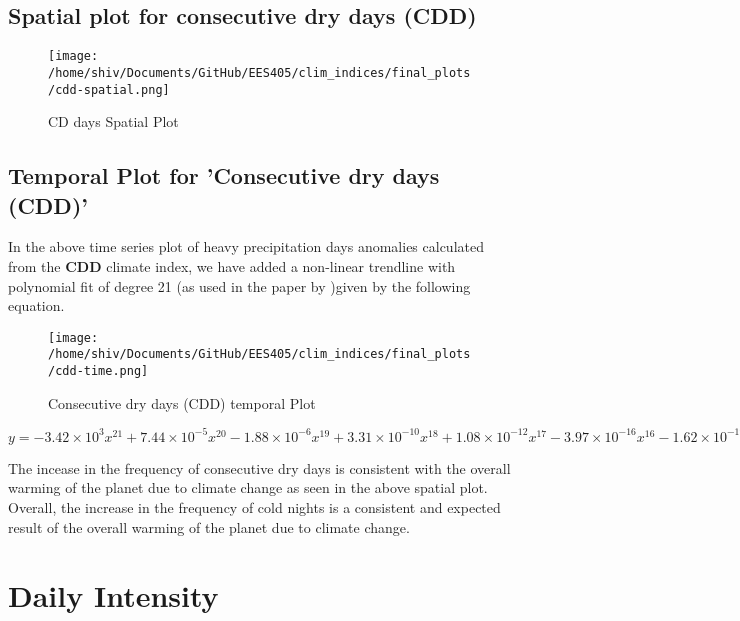 \documentclass[a4paper, 12pt, twoside]{report}
\begin{document}
\subsection {Spatial plot for consecutive dry days (CDD)}
\begin{figure}[htb]
    \centering
    \texttt{[image: /home/shiv/Documents/GitHub/EES405/clim\_indices/final\_plots/cdd-spatial.png]}
    \caption{CD days Spatial Plot}
    \label{fig:cdd_spatial}
\end{figure}

\subsection{Temporal Plot for 'Consecutive dry days (CDD)'}
In the above time series plot of heavy precipitation days anomalies calculated from the \textbf{CDD} climate index, we have added a non-linear trendline with polynomial fit of degree 21 (as used in the paper by )given by the following equation.
\begin{figure}[htb]
    \centering
    \texttt{[image: /home/shiv/Documents/GitHub/EES405/clim\_indices/final\_plots/cdd-time.png]}
    \caption{Consecutive dry days (CDD) temporal Plot}
    \label{fig:cdd_temporal}
\end{figure}

$ y = -3.42\times10^{3}x^{21}+7.44\times10^{-5}x^{20}-1.88\times10^{-6}x^{19}+3.31\times10^{-10}x^{18}+1.08\times10^{-12}x^{17}-3.97\times10^{-16}x^{16}-1.62\times10^{-19}x^{15}+1.05\times10^{-22}x^{14}-5.80\times10^{-27}x^{13}-8.00\times10^{-30}x^{12}+2.29\times10^{-33}x^{11}-1.20\times10^{-37}x^{10}-6.72\times10^{-41}x^{9}+1.99\times10^{-44}x^{8}-2.95\times10^{-48}x^{7}+2.85\times10^{-52}x^{6}-1.92\times10^{-56}x^{5}+9.12\times10^{-61}x^{4}-3.03\times10^{-65}x^{3}+6.69\times10^{-70}x^{2}-8.87\times10^{-75}x+5.34\times10^{-80}$

The incease in the frequency of consecutive dry days is consistent with the overall warming of the planet due to climate change as seen in the above spatial plot.\\
Overall, the increase in the frequency of cold nights is a consistent and expected result of the overall warming of the planet due to climate change.

\section {Daily Intensity}
\end{document}
